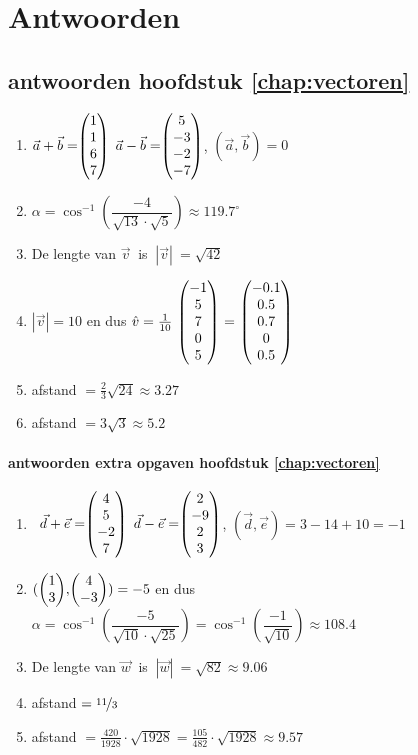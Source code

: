\chapter{Antwoorden}

\section{antwoorden  hoofdstuk \ref{chap:vectoren}}
\begin{enumerate}
	\item   $ \vec{a} + \vec{b}  = \vecvier{1}{1}{6}{7} $   \qquad $ \vec{a} - \vec{b} = \vecvier{5}{-3}{-2}{-7} $,   \qquad $  (\vec{a} , \vec{b}) = 0 $ 
	
	
	\item  $\alpha = \cos ^{-1} \left(\dfrac{-4}{\sqrt{13}\cdot\sqrt{5}}\right) \approx 119.7^\circ $ 
	
	\item De lengte van  $  \vec{v} \ $ is $ \ |\vec{v}| \  =  \sqrt{42}$
	
	\item $|\vec{v}| = 10$ en dus $ \hat{v} = \frac{1}{10}\  \vecvijf{-1}{5}{7}{0}{5} \  = \  \vecvijf{-0.1}{0.5}{0.7}{0}{0.5} $
	
  \item afstand  $ = \frac{2}{3}\sqrt{24} \approx 3.27 $

	\item afstand  $ = 3\sqrt{3} \approx 5.2 $
\end{enumerate}

\subsubsection{antwoorden extra opgaven hoofdstuk \ref{chap:vectoren}}
\begin{enumerate}
	
	\item  \ $ \vec{d} + \vec{e}  = \vecvier{4}{5}{-2}{7} $   \qquad $ \vec{d} - \vec{e} = \vecvier{2}{-9}{2}{3} $,   \qquad $  (\vec{d} , \vec{e}) = 3-14+10 = -1 $ 
	
	\item $  (\vectwee{1}{3} , \vectwee{4}{-3}) = -5 $  en dus $\alpha = \cos ^{-1} \left(\dfrac{-5}{\sqrt{10}\cdot\sqrt{25}}\right)= \cos ^{-1} \left(\dfrac{-1}{\sqrt{10}}\right) \approx 108.4 $ 
	
	\item De lengte van  $  \vec{w} \ $ is $ \ |\vec{w}| \  =  \sqrt{82} \approx 9.06 $
	
	\item    afstand  $ = \nicefrac{11}{3} $

	\item afstand  $ = \frac{420}{1928}\cdot\sqrt{1928} = \frac{105}{482}\cdot\sqrt{1928} \approx 9.57 $
\end{enumerate}	

